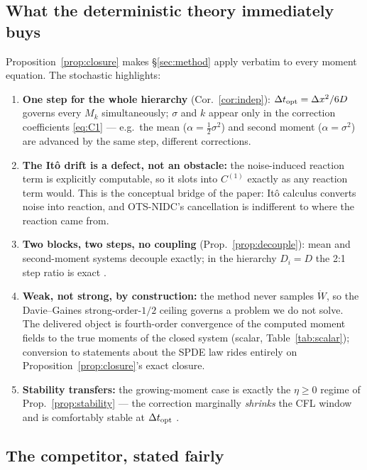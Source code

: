\subsection{What the deterministic theory immediately buys}

Proposition~\ref{prop:closure} makes \S\ref{sec:method} apply verbatim to every
moment equation. The stochastic highlights:

\begin{enumerate}
\item \textbf{One step for the whole hierarchy} (Cor.~\ref{cor:indep}):
$\Delta t_{\mathrm{opt}} = \Delta x^2/6D$ governs every $M_k$ simultaneously; $\sigma$ and $k$ appear
only in the correction coefficients \eqref{eq:C1} --- e.g.\ the mean ($\alpha=
\frac12\sigma^2$) and second moment ($\alpha=\sigma^2$) are advanced by the
same step, different corrections.
\item \textbf{The It\^o drift is a defect, not an obstacle:} the noise-induced
reaction term is explicitly computable, so it slots into $C^{(1)}$ exactly as
any reaction term would. This is the conceptual bridge of the paper: It\^o
calculus converts noise into reaction, and OTS-NIDC's cancellation is
indifferent to where the reaction came from.
\item \textbf{Two blocks, two steps, no coupling} (Prop.~\ref{prop:decouple}):
mean and second-moment systems decouple exactly; in the hierarchy $D_i=D$ the
2:1 step ratio is exact \tagV.
\item \textbf{Weak, not strong, by construction:} the method never samples
$\dot W$, so the Davie--Gaines strong-order-$1/2$ ceiling \citep{davie2001}
governs a problem we do not solve. The delivered object is fourth-order
convergence of the computed moment fields to the true moments of the closed
system \tagV (scalar, Table~\ref{tab:scalar}); conversion to statements about
the SPDE law rides entirely on Proposition~\ref{prop:closure}'s exact closure.
\item \textbf{Stability transfers:} the growing-moment case is exactly the
$\eta\ge0$ regime of Prop.~\ref{prop:stability} --- the correction marginally
\emph{shrinks} the CFL window and is comfortably stable at $\Delta t_{\mathrm{opt}}$ \tagV.
\end{enumerate}

\subsection{The competitor, stated fairly}

